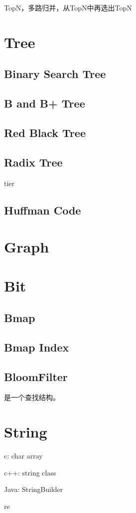 TopN，多路归并，从TopN中再选出TopN

\section{Tree}

\subsection{Binary Search Tree}

\subsection{B and B+ Tree}

\subsection{Red Black Tree}

\subsection{Radix Tree}

tier

\subsection{Huffman Code}

\section{Graph}

\section{Bit}

\subsection{Bmap}

\subsection{Bmap Index}

\subsection{BloomFilter}

是一个查找结构。

\section{String}

\begin{enumbox}
\item c: char array
\item c++: string class
\item Java: StringBuilder
\item re
\end{enumbox}
